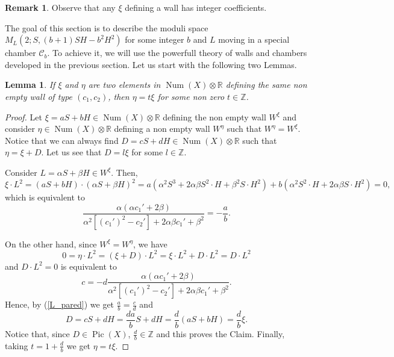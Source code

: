 \documentclass[11pt,twoside]{amsart}
\newtheorem{lemma}[theorem]{Lemma}
\theoremstyle{definition}
\newtheorem{remark}[theorem]{Remark}
\newcommand{\Pic}{\operatorname{Pic}}
\newcommand{\Num}{\operatorname{Num}}
\begin{document}
\begin{remark}
    Observe that any $\xi$ defining a wall has integer coefficients.
\end{remark}

The goal of this section is to  describe the moduli space $M_{L}(2; S, (b+1)SH-b^2H^2)$ for some integer $b$ and $L$ moving in a special chamber $\mathcal{C}_b$. To achieve it, we will use the powerfull theory of walls and chambers developed in the previous section.
Let us start with the following two Lemmas.

\begin{lemma}
\label{misma_pared}
    If $\xi$ and $\eta$ are two elements in $\Num(X)\otimes\mathbb{R}$ defining the same non empty wall of type $(c_1,c_2)$, then $\eta = t\xi$ for some non zero $t\in \mathbb{Z}$.
\end{lemma}
\begin{proof}
   Let $\xi= a S+bH \in\Num(X)\otimes\mathbb{R}$ defining the non empty wall $W^{\xi}$ and consider $\eta\in \Num(X)\otimes\mathbb{R}$ defining a non empty wall $W^{\eta}$ such that $W^{\eta}=W^{\xi}$. Notice that we can always find $D=c S+dH\in\Num(X)\otimes\mathbb{R}$ such that $\eta=\xi +D$. Let us see that $D=l\xi$ for some $l\in\mathbb{Z}$.
   
Consider
   $L= \alpha S+\beta H\in W^\xi$.
   Then, 
   $$\xi\cdot L^2 =(aS+bH)\cdot (\alpha S+\beta H)^2 
      =a(\alpha^2S^3+2\alpha\beta S^2\cdot H+\beta^2S\cdot H^2)+b(\alpha^2S^2\cdot H+2\alpha\beta S\cdot H^2) =0, $$
which is equivalent to 
\begin{equation}
    \label{L_pared}
    \frac{\alpha(\alpha c_1'+2\beta)}{\alpha^2[(c_1')^2-c_2']+2\alpha\beta c_1'+\beta^2}=-\frac{a}{b}.
\end{equation}

On the other hand, since $W^{\xi}=W^{\eta}$, we have $$0=\eta\cdot L^2=(\xi +D)\cdot L^2=\xi\cdot L^2+D\cdot L^2= D\cdot L^2$$
and $D\cdot L^2=0$ is equivalent to  $$c=-d\frac{\alpha(\alpha c_1'+2\beta)}{\alpha^2[(c_1')^2-c_2']+2\alpha\beta c_1'+\beta^2}.$$ Hence, by (\ref{L_pared}) we get $\frac{a}{b}=\frac{c}{d}$ and $$D=cS+dH=\frac{d a}{b}S+dH=\frac{d}{b}(aS+bH)=\frac{d}{b}\xi.$$  Notice that, since $D\in \Pic(X)$, $\frac{d}{b}\in\mathbb{Z}$ and this proves the Claim.
Finally, taking $t=1+\frac{d}{b}$ we get $\eta=t\xi$.
\end{proof}
\end{document}
